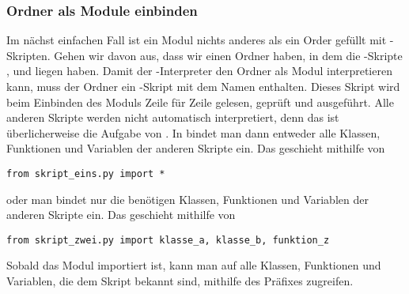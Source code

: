\subsubsection{Ordner als Module einbinden}
Im nächst einfachen Fall ist ein Modul nichts anderes als ein Order gefüllt mit \Python-Skripten.
Gehen wir davon aus, dass wir einen Ordner  haben, in dem die \Python-Skripte ,  und  liegen haben.
Damit der \Python-Interpreter den Ordner  als Modul interpretieren kann, muss der Ordner ein \Python-Skript mit dem Namen  enthalten.
Dieses Skript wird beim Einbinden des Moduls Zeile für Zeile gelesen, geprüft und ausgeführt.
Alle anderen Skripte werden nicht automatisch interpretiert, denn das ist überlicherweise die Aufgabe von .
In  bindet man dann entweder alle Klassen, Funktionen und Variablen der anderen Skripte ein.
Das geschieht mithilfe von
\begin{lstlisting}
from skript_eins.py import *
\end{lstlisting}
oder man bindet nur die benötigen Klassen, Funktionen und Variablen der anderen Skripte ein.
Das geschieht mithilfe von
\begin{lstlisting}
from skript_zwei.py import klasse_a, klasse_b, funktion_z
\end{lstlisting}
Sobald das Modul  importiert ist, kann man auf alle Klassen, Funktionen und Variablen, die dem Skript  bekannt sind, mithilfe des Präfixes  zugreifen.

